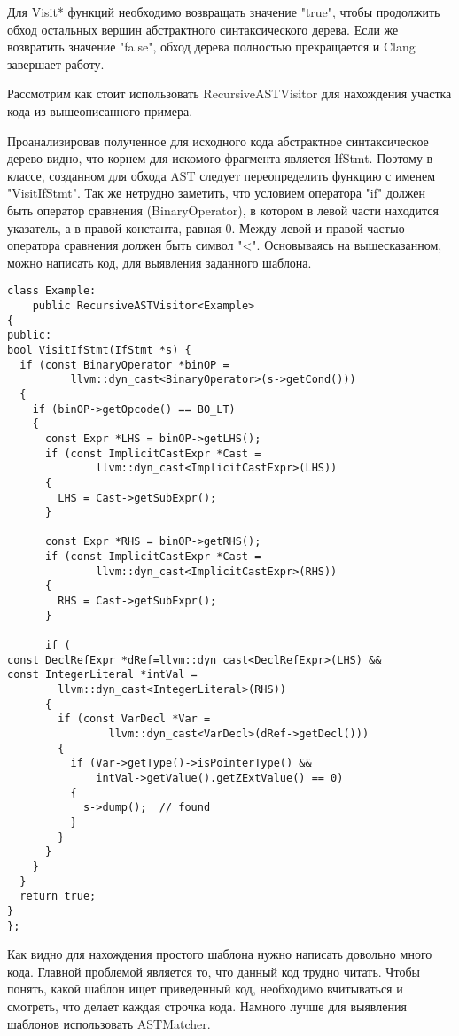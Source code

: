 Для Visit* функций необходимо возвращать значение "true", чтобы продолжить обход остальных вершин
абстрактного синтаксического дерева. Если же возвратить значение "false", обход дерева полностью
прекращается и Clang завершает работу.

Рассмотрим как стоит использовать RecursiveASTVisitor для нахождения участка кода из вышеописанного
примера.

Проанализировав полученное для исходного кода абстрактное синтаксическое дерево видно, что 
корнем для искомого фрагмента является IfStmt. Поэтому в классе, созданном для обхода AST
следует переопределить функцию с именем "VisitIfStmt". Так же нетрудно заметить, что условием 
оператора "if" должен быть оператор сравнения (BinaryOperator), в котором в левой части
находится указатель, а в правой константа, равная 0. Между левой и правой частью оператора сравнения
должен быть символ "<". Основываясь на вышесказанном, можно написать код, для выявления заданного шаблона.
\begin{lstlisting}
class Example:
	public RecursiveASTVisitor<Example> 
{
public:
bool VisitIfStmt(IfStmt *s) {
  if (const BinaryOperator *binOP =
          llvm::dyn_cast<BinaryOperator>(s->getCond())) 
  {
    if (binOP->getOpcode() == BO_LT) 
    {
      const Expr *LHS = binOP->getLHS();
      if (const ImplicitCastExpr *Cast =
              llvm::dyn_cast<ImplicitCastExpr>(LHS)) 
      {
        LHS = Cast->getSubExpr();
      }
      
      const Expr *RHS = binOP->getRHS();
      if (const ImplicitCastExpr *Cast =
              llvm::dyn_cast<ImplicitCastExpr>(RHS)) 
      {
        RHS = Cast->getSubExpr();
      } 

      if (
const DeclRefExpr *dRef=llvm::dyn_cast<DeclRefExpr>(LHS) &&
const IntegerLiteral *intVal = 
		llvm::dyn_cast<IntegerLiteral>(RHS)) 
	  {
        if (const VarDecl *Var =
                llvm::dyn_cast<VarDecl>(dRef->getDecl())) 
        {
          if (Var->getType()->isPointerType() &&
              intVal->getValue().getZExtValue() == 0) 
          {
            s->dump();  // found
          }
        }
      }
    }
  }
  return true;
}
};
\end{lstlisting}

Как видно для нахождения простого шаблона нужно написать довольно много кода. Главной проблемой 
является то, что данный код трудно читать. Чтобы понять, какой шаблон ищет приведенный код,
необходимо вчитываться и смотреть, что делает каждая строчка кода. Намного лучше для выявления 
шаблонов использовать ASTMatcher.


